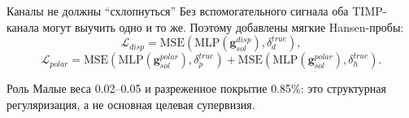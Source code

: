 \documentclass[aspectratio=169,10pt]{beamer}
\begin{document}
\begin{frame}{Каналы не должны ``схлопнуться''}
  \small
  Без вспомогательного сигнала оба TIMP-канала могут выучить одно и то же. Поэтому добавлены мягкие Hansen-пробы:
  \[
    \mathcal{L}_{disp}=\mathrm{MSE}(\mathrm{MLP}(\mathbf{g}_{sol}^{disp}),\delta_d^{true}),
  \]
  \[
    \mathcal{L}_{polar}=
    \mathrm{MSE}(\mathrm{MLP}(\mathbf{g}_{sol}^{polar}),\delta_p^{true})
    +
    \mathrm{MSE}(\mathrm{MLP}(\mathbf{g}_{sol}^{polar}),\delta_h^{true}).
  \]
  \begin{block}{Роль}
    Малые веса 0.02–0.05 и разреженное покрытие 0.85\%: это структурная регуляризация, а не основная целевая супервизия.
  \end{block}
\end{frame}
\end{document}
